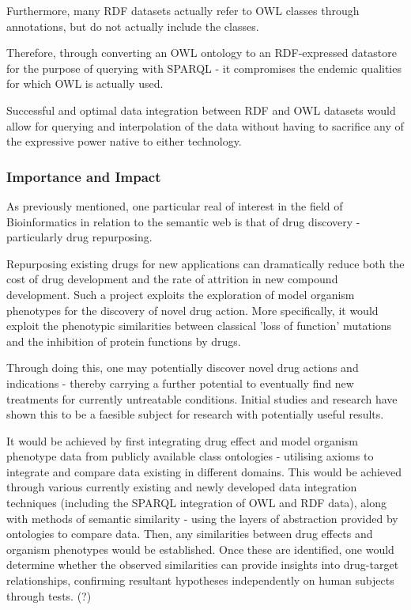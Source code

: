 \documentclass{article}
\begin{document}
Furthermore, many RDF datasets actually refer to OWL classes through
annotations, but do not actually include the classes.

Therefore, through converting an OWL ontology to an RDF-expressed datastore for
the purpose of querying with SPARQL - it compromises the endemic qualities for
which OWL is actually used.

Successful and optimal data integration between RDF and OWL datasets would allow
for querying and interpolation of the data without having to sacrifice any of
the expressive power native to either technology.

\subsubsection{Importance and Impact}


As previously mentioned, one particular real of interest in the field of
Bioinformatics in relation to the semantic web is that of drug discovery -
particularly drug repurposing\cite{pharmgkb}.

Repurposing existing drugs for new applications can dramatically reduce both
the cost of drug development and the rate of attrition in new compound
development. Such a project exploits the exploration of model organism
phenotypes for the discovery of novel drug action. More specifically, it would
exploit the phenotypic similarities between classical 'loss of function'
mutations and the inhibition of protein functions by drugs.

Through doing this, one may potentially discover novel drug actions and
indications - thereby carrying a further potential to eventually find new treatments for
currently untreatable conditions. Initial studies and research have shown this
to be a faesible subject for research with potentially useful
results.\cite{drugrepurposeinitial}

It would be achieved by first integrating drug effect and model organism
phenotype data from publicly available class ontologies - utilising axioms to
integrate and compare data existing in different domains. This would be achieved
through various currently existing and  newly developed data integration techniques 
(including the SPARQL integration of OWL and RDF data), along with methods of
semantic similarity - using the layers of abstraction provided by ontologies
to compare data. Then, any similarities between drug effects and organism
phenotypes would be established. Once these are identified, one would determine 
whether the observed similarities can provide insights into drug-target relationships, 
confirming resultant hypotheses independently on human subjects through tests.
(?)
\end{document}
